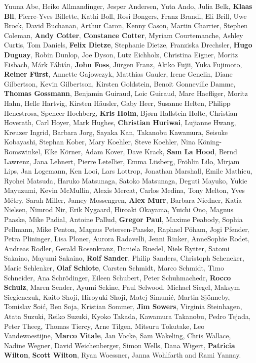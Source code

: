 Yuuna Abe,
Heiko Allmandinger,
Jesper Andersen,
Yuta Ando,
Julia Belk,
\textbf{Klaas Bil},
Pierre-Yves Billette,
Kathi Boll,
Rosi Bongers,
Franz Brandl,
Eli Brill,
Uwe Brock,
David Buchanan,
Arthur Caron,
Kenny Cason,
Martin  Charrier,
Stephen Coleman,
\textbf{Andy Cotter},
\textbf{Constance Cotter},
Myriam Courtemanche,
Ashley  Curtis,
Tom Daniels,
\textbf{Felix Dietze},
Stephanie Dietze,
Franziska Drechsler,
\textbf{Hugo Duguay},
Robin Dunlop,
Joe Dyson,
Lutz Eichholz,
Christina Eigner,
Moritz Eisbach,
M\'{a}rk  F\'{a}bi\'{a}n,
\textbf{John Foss},
J\"{u}rgen  Franz,
Akiko Fujii,
Yuka Fujimoto,
\textbf{Reiner F\"{u}rst},
Annette Gajowczyk,
Matthias Gauler,
Irene Genelin,
Diane Gilbertson,
Kevin Gilbertson,
Kirsten Goldstein,
Benoit Gonneville Damme,
\textbf{Thomas Gossmann},
Benjamin Guiraud,
Loic Guiraud,
Marc Haefliger,
Moritz Hahn,
Helle Hartvig,
Kirsten H\"{a}usler,
Gaby Heer,
Susanne Helten,
Philipp Henestrosa,
Spencer Hochberg,
\textbf{Kris Holm},
Bj{\o}rn Hallstein Holte,
Christian Hoverath,
Carl Hoyer,
Mark  Hughes,
\textbf{Christian Huriwai},
Lujianne Hwang,
Kreuzer Ingrid,
Barbara Jorg,
Sayaka Kan,
Takanobu Kawamura,
Seisuke Kobayashi,
Stephan Kober,
Mary  Koehler,
Steve Koehler,
Nina K\"{o}ning-Romswinkel,
Elke K\"{o}rner,
Adam Kover,
Dave Krack,
\textbf{Sam La Hood},
Bernd Lawrenz,
Jana Lehnert,
Pierre Letellier,
Emma Liisberg,
Fr\"{o}hlin Lilo,
Mirjam  Lips,
Jan Logemann,
Ken Looi,
Lars Lottrop,
Jonathan Marshall,
Emile Mathieu,
Ryohei Matsuda,
Haruko Matsunaga,
Satoko Matsunaga,
Deguti Mayuko,
Yukie Mayuzumi,
Kevin McMullin,
Alexis  Mercat,
Carlos Medina,
Tony Melton,
Yves M\'{e}try,
Sarah Miller,
Jamey Mossengren,
\textbf{Alex  Murr},
Barbara Niedner,
Katia Nielsen,
Nimrod Nir,
Erik Nygaard,
Hiroaki Okayama,
Yuichi Ono,
Magnus Paaske,
Mike Padial,
Antoine Pallud,
\textbf{Gregor Paul},
Maxime Peabody,
Sophia Pellmann,
Mike Penton,
Magnus Petersen-Paaske,
Raphael P\"{o}ham,
Jogi Pfender,
Petra Plininger,
Lisa Ploner,
Aurora Radavelli,
Jenni Rinker,
AnneSophie Rodet,
Andreas Rodler,
Gerald  Rosenkranz,
Daniela Ruedel,
Niels Rytter,
Satomi Sakaino,
Mayumi Sakaino,
\textbf{Rolf Sander},
Philip  Sanders,
Christoph Scheneker,
Marie Schlenker,
\textbf{Olaf Schlote},
Carsten Schmidt,
Marco Schmidt,
Timo Schneider,
Ana Schr\"{o}dinger,
Eileen  Schubert,
Peter Schuhmachedr,
\textbf{Rocco Schulz},
Maren Sender,
Ayumi Sekine,
Paul Selwood,
Michael Siegel,
Maksym  Siegienczuk,
Kaito Shoji,
Hiroyuki Shoji,
Matej \u{S}imuni\'{c},
Martin Sjönneby,
Tomislav \u{S}oi\'{c},
Ben Soja,
Kristian Sommer,
\textbf{Jim Sowers},
Virginia Steinhagen,
Atata Suzuki,
Reiko Suzuki,
Kyoko Takada,
Kawamura Takanobu,
Pedro Tejada,
Peter Theeg,
Thomas  Tiercy,
Arne Tilgen,
Mitsuru Tokutake,
Leo Vandewoestijne,
\textbf{Marco Vitale},
Jan Vocke,
Sam Wakeling,
Chris Wallace,
Nadine Wegner,
David Weichenberger,
Simon Wells,
Dana Wigert,
\textbf{Patricia  Wilton},
\textbf{Scott Wilton},
Ryan Woessner,
Janna Wohlfarth
and
Rami Yannay.